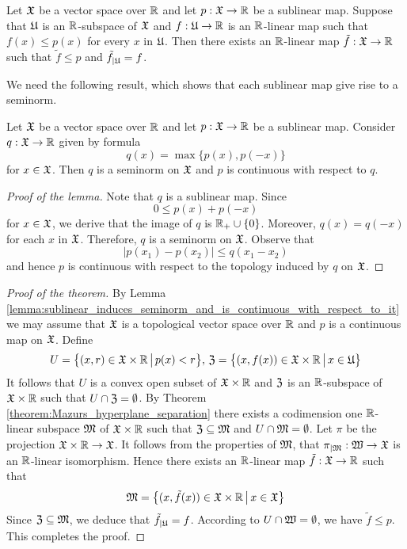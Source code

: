 \begin{theorem}\label{theorem:Hahn_Banach_real_case}
   Let ${\mathfrak X}$ be a vector space over ${\mathbb R}$ and let $p:{\mathfrak X}\rightarrow {\mathbb R}$ be a sublinear map. Suppose that ${\mathfrak U}$ is an ${\mathbb R}$-subspace of ${\mathfrak X}$ and $f:{\mathfrak U}\rightarrow {\mathbb R}$ is an ${\mathbb R}$-linear map such that $f(x) \leq p(x)$ for every $x$ in ${\mathfrak U}$. Then there exists an ${\mathbb R}$-linear map $\tilde{f}:{\mathfrak X} \rightarrow {\mathbb R}$ such that $\tilde{f} \leq p$ and $\tilde{f}_{\mid {\mathfrak U}} = f$.
\end{theorem}
\noindent
We need the following result, which shows that each sublinear map give rise to a seminorm.

\begin{lemma}\label{lemma:sublinear_induces_seminorm_and_is_continuous_with_respect_to_it}
   Let ${\mathfrak X}$ be a vector space over ${\mathbb R}$ and let $p:{\mathfrak X} \rightarrow {\mathbb R}$ be a sublinear map. Consider $q:{\mathfrak X} \rightarrow {\mathbb R}$ given by formula
   $$q(x) = \max\{p(x),p(-x)\}$$
   for $x \in {\mathfrak X}$. Then $q$ is a seminorm on ${\mathfrak X}$ and $p$ is continuous with respect to $q$.
\end{lemma}
\begin{proof}[Proof of the lemma]
   Note that $q$ is a sublinear map. Since
   $$0\leq p(x) + p(-x)$$
   for $x \in {\mathfrak X}$, we derive that the image of $q$ is ${\mathbb R}_+\cup \{0\}$. Moreover, $q(x) = q(-x)$ for each $x$ in ${\mathfrak X}$. Therefore, $q$ is a seminorm on ${\mathfrak X}$. Observe that
   $$|p(x_1) - p(x_2)|\leq q(x_1 - x_2)$$
   and hence $p$ is continuous with respect to the topology induced by $q$ on ${\mathfrak X}$.
\end{proof}

\begin{proof}[Proof of the theorem]
   By Lemma \ref{lemma:sublinear_induces_seminorm_and_is_continuous_with_respect_to_it} we may assume that ${\mathfrak X}$ is a topological vector space over ${\mathbb R}$ and $p$ is a continuous map on ${\mathfrak X}$. Define
   $$U = \big\{(x,r)\in {\mathfrak X}\times {\mathbb R}\,\big|\,p(x) < r\big\},\,{\mathfrak Z} = \big\{(x,f(x))\in {\mathfrak X}\times {\mathbb R}\,\big|\,x\in {\mathfrak U}\big\}$$
   It follows that $U$ is a convex open subset of ${\mathfrak X}\times {\mathbb R}$ and ${\mathfrak Z}$ is an ${\mathbb R}$-subspace of ${\mathfrak X}\times {\mathbb R}$ such that $U \cap {\mathfrak Z} = \emptyset$. By Theorem \ref{theorem:Mazurs_hyperplane_separation} there exists a codimension one ${\mathbb R}$-linear subspace ${\mathfrak M}$ of ${\mathfrak X}\times {\mathbb R}$ such that ${\mathfrak Z} \subseteq {\mathfrak M}$ and $U\cap {\mathfrak M} = \emptyset$. Let $\pi$ be the projection ${\mathfrak X}\times {\mathbb R}\rightarrow {\mathfrak X}$. It follows from the properties of ${\mathfrak M}$, that $\pi_{\mid {\mathfrak M}}:{\mathfrak W}\rightarrow {\mathfrak X}$ is an ${\mathbb R}$-linear isomorphism. Hence there exists an ${\mathbb R}$-linear map $\tilde{f}:{\mathfrak X} \rightarrow {\mathbb R}$ such that
   $${\mathfrak M} = \big\{(x,\tilde{f}(x))\in {\mathfrak X}\times {\mathbb R}\,\big|\,x \in {\mathfrak X}\big\}$$
   Since ${\mathfrak Z} \subseteq {\mathfrak M}$, we deduce that $\tilde{f}_{\mid {\mathfrak U}} = f$. According to $U\cap {\mathfrak W} = \emptyset$, we have $\tilde{f} \leq p$. This completes the proof.
\end{proof}

